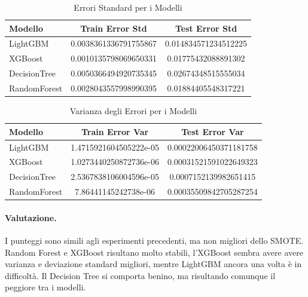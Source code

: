 \begin{table}[H]
    \centering
    \begin{tabular}{lcc}
    \toprule
    \textbf{Modello} & \textbf{Train Error Std} & \textbf{Test Error Std} \\
    \midrule
    LightGBM & 0.0038361336791755867 & 0.014834571234512225 \\
    XGBoost & 0.0010135798069650331 & 0.01775432088891302 \\
    DecisionTree & 0.0050366494920735345 & 0.02674348515555034 \\
    RandomForest & 0.0028043557998990395 & 0.01884405548317221 \\
    \bottomrule
    \end{tabular}
    \caption{Errori Standard per i Modelli}
    
\end{table}

\begin{table}[H]
    \centering
    \begin{tabular}{lcc}
    \toprule
    \textbf{Modello} & \textbf{Train Error Var} & \textbf{Test Error Var} \\
    \midrule
    LightGBM & 1.4715921604505222e-05 & 0.00022006450371181758 \\
    XGBoost & 1.0273440250872736e-06 & 0.00031521591022649323 \\
    DecisionTree & 2.5367838106004596e-05 & 0.0007152139982651415\\
    RandomForest & 7.86441145242738e-06 & 0.00035509842705287254 \\
    \bottomrule
    \end{tabular}
    \caption{Varianza degli Errori per i Modelli}
    
\end{table}

\paragraph{Valutazione.} I punteggi sono simili agli esperimenti precedenti, ma non migliori dello SMOTE. \\ Random Forest e XGBoost risultano molto stabili, l'XGBoost sembra avere avere varianza e deviazione standard migliori, mentre LightGBM ancora una volta è in difficoltà. Il Decision Tree si comporta benino, ma risultando comunque il peggiore tra i modelli.


